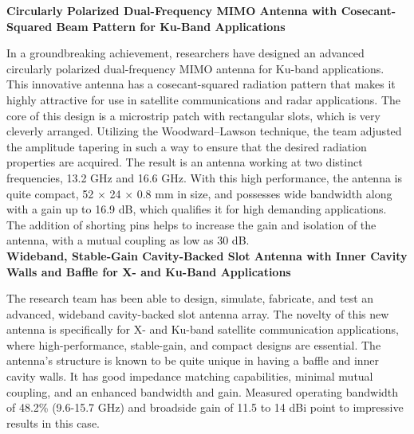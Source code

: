 \documentclass[12pt]{article}
\begin{document}
\noindent \textbf{Circularly Polarized Dual-Frequency MIMO Antenna with Cosecant-Squared Beam Pattern for Ku-Band Applications}
\par In a groundbreaking achievement, researchers have designed an advanced circularly polarized dual-frequency MIMO antenna for Ku-band applications. This innovative antenna has a cosecant-squared radiation pattern that makes it highly attractive for use in satellite communications and radar applications. The core of this design is a microstrip patch with rectangular slots, which is very cleverly arranged. Utilizing the Woodward–Lawson technique, the team adjusted the amplitude tapering in such a way to ensure that the desired radiation properties are acquired. The result is an antenna working at two distinct frequencies, 13.2 GHz and 16.6 GHz. With this high performance, the antenna is quite compact, 52 × 24 × 0.8 mm in size, and possesses wide bandwidth along with a gain up to 16.9 dB, which qualifies it for high demanding applications. The addition of shorting pins helps to increase the gain and isolation of the antenna, with a mutual coupling as low as 30 dB.\\


\noindent \textbf{Wideband, Stable-Gain Cavity-Backed Slot Antenna with Inner Cavity Walls and Baffle for X- and Ku-Band Applications}
\par The research team has been able to design, simulate, fabricate, and test an advanced, wideband cavity-backed slot antenna array. The novelty of this new antenna is specifically for X- and Ku-band satellite communication applications, where high-performance, stable-gain, and compact designs are essential. The antenna's structure is known to be quite unique in having a baffle and inner cavity walls. It has good impedance matching capabilities, minimal mutual coupling, and an enhanced bandwidth and gain. Measured operating bandwidth of 48.2\% (9.6-15.7 GHz) and broadside gain of 11.5 to 14 dBi point to impressive results in this case.\\
\end{document}
